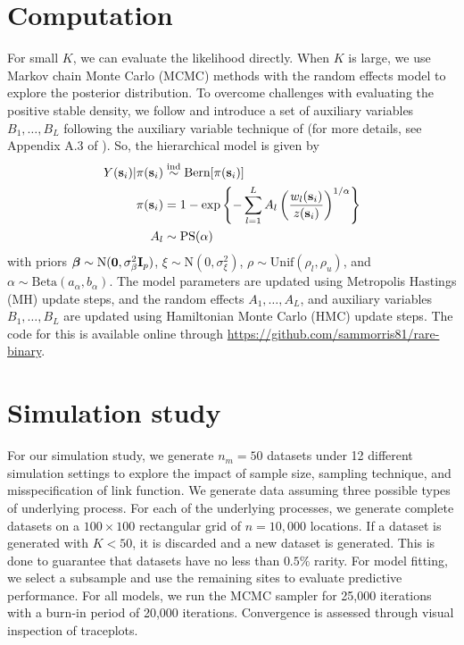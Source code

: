 \section{Computation}\label{rbs:comp}
For small $K$, we can evaluate the likelihood directly.
When $K$ is large, we use Markov chain Monte Carlo (MCMC) methods with the random effects model to explore the posterior distribution.
To overcome challenges with evaluating the positive stable density, we follow \citet{Reich2012} and introduce a set of auxiliary variables $B_1, \ldots, B_L$ following the auxiliary variable technique of \citet{Stephenson2009} (for more details, see Appendix A.3 of \citet{Reich2012}).
So, the hierarchical model is given by
\begin{align}
  Y(\mathbf{s}_i) | \pi(\mathbf{s}_i) &\stackrel{\mathrm{ind}}{\sim} \text{Bern}[\pi(\mathbf{s}_i)] \\
    \pi(\mathbf{s}_i) &= 1 - \exp \left\{ -\displaystyle \sum_{ l = 1 }^{L} A_l \left( \frac{ w_{l}(\mathbf{s}_i) }{ z(\mathbf{s}_i) } \right)^{ 1/\alpha} \right\} \nonumber\\
    A_l &\sim \text{PS}(\alpha) \nonumber
\end{align}
with priors $\mbox{\boldmath $\beta$} \sim \text{N}(\mathbf{0}, \sigma^2_\beta \mathbf{I}_p )$, $\xi \sim \text{N}(0, \sigma^2_\xi)$, $\rho \sim \text{Unif}(\rho_l, \rho_u)$, and $\alpha \sim \text{Beta}(a_\alpha, b_\alpha)$.
The model parameters are updated using Metropolis Hastings (MH) update steps, and the random effects $A_1, \ldots, A_L$, and auxiliary variables $B_1, \ldots, B_L$ are updated using Hamiltonian Monte Carlo (HMC) update steps.
The code for this is available online through \url{https://github.com/sammorris81/rare-binary}.

\section{Simulation study}\label{rbs:sim}

For our simulation study, we generate $n_m = 50$ datasets under 12 different simulation settings to explore the impact of sample size, sampling technique, and misspecification of link function.
We generate data assuming three possible types of underlying process.
For each of the underlying processes, we generate complete datasets on a $100 \times 100$ rectangular grid of $n = 10,000$ locations.
If a dataset is generated with $K < 50$, it is discarded and a new dataset is generated.
This is done to guarantee that datasets have no less than $0.5\%$ rarity.
For model fitting, we select a subsample and use the remaining sites to evaluate predictive performance.
For all models, we run the MCMC sampler for 25,000 iterations with a burn-in period of 20,000 iterations.
Convergence is assessed through visual inspection of traceplots.

